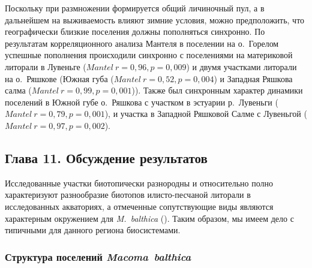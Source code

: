 {Поскольку при размножении формируется общий личиночный пул, а в дальнейшем на выживаемость влияют зимние условия, можно предположить, что географически близкие поселения должны пополняться синхронно.
По результатам корреляционного анализа Мантеля в поселении на о.~Горелом успешные пополнения происходили синхронно с поселениями на материковой литорали в Лувеньге ($Mantel\ r = 0,96, p = 0,009$) и двумя участками литорали на о.~Ряшкове (Южная губа ($Mantel\ r = 0,52, p = 0,004$) и Западная Ряшкова салма ($Mantel\ r = 0,99, p = 0,001$)).
Также был синхронным характер динамики поселений в Южной губе о.~Ряшкова с участком в эстуарии р.~Лувеньги ($Mantel\ r = 0,79, p = 0,001$), и участка в Западной Ряшковой Салме с Лувеньгой ($Mantel\ r = 0,97, p = 0,002$).

\subsection*{Глава 11. Обсуждение результатов}
Исследованные участки биотопически разнородны и относительно полно характеризуют разнообразие биотопов илисто-песчаной литорали в исследованных акваториях, а отмеченные сопутствующие виды являются характерным окружением для \textit{M.~balthica} (\cite{Derugin_1915, Guryanova_et_al_1928, Guryanova_Ushakov_1929, Guryanova_et_al_1930, Babkov_Golikov_1984, Naumov_Fedyakov_1993, Chertoprud_et_al_2004, Naumov_2006, Gerasimova_et_al_2010, Derevenschikov_Kravets_2010, Stolyarov_2010}). Таким образом, мы имеем дело с типичными для данного региона биосистемами.

\subsubsection*{Структура поселений \textit{Macoma~balthica}}
}
